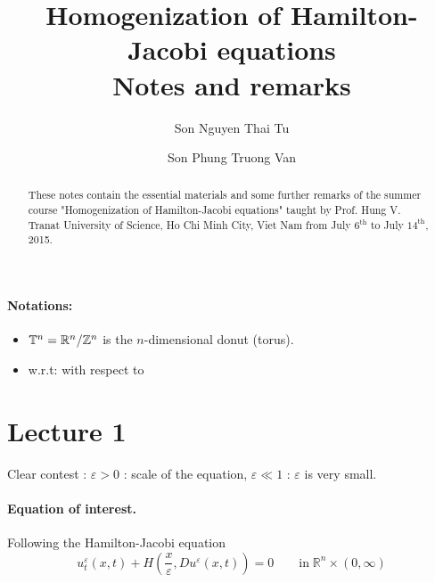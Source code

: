 \documentclass[12pt, oneside]{amsart}  	%
\title{Homogenization of Hamilton-Jacobi equations\\
Notes and remarks}
\author{Son Nguyen Thai Tu}
\author{Son Phung Truong Van}
\date{}							%
\newcommand\Z{\mathbb{Z}} \newcommand\N{\mathbb{N}} \newcommand\C{\mathbb{C}}
\begin{document}
\maketitle

\begin{abstract}
These notes contain the essential materials and some further remarks of the summer course "Homogenization of Hamilton-Jacobi equations" taught by Prof. Hung V. Tran\footnotemark at University of Science, Ho Chi Minh City, Viet Nam from July $6^{\text{th}}$ to July $14^{\text{th}}$, 2015.
\end{abstract}






\newpage



\paragraph{\textbf{Notations:}}
\begin{itemize}
	\item $\mathbb{T}^n=\R^n/\Z^n$ is the $n$-dimensional donut (torus).
	\item w.r.t: with respect to
\end{itemize}

\vspace*{0.5cm}

\vspace*{0.5cm}
\section*{{\LARGE Lecture 1}}
\vspace*{0.5cm}

Clear contest : $\varepsilon>0$ : scale of the equation, $\varepsilon \ll 1$ : $\varepsilon$ is very small.\\

\paragraph{\textbf{Equation of interest.}} Following the Hamilton-Jacobi equation
\begin{equation}
u_t^{\varepsilon} (x,t) + H\left(\frac{x}{\varepsilon},Du^\varepsilon(x,t)\right) = 0\qquad\text{in}\;\mathbb{R}^n\times (0,\infty) \tag{I} \label{eq}
\end{equation}
\end{document}
